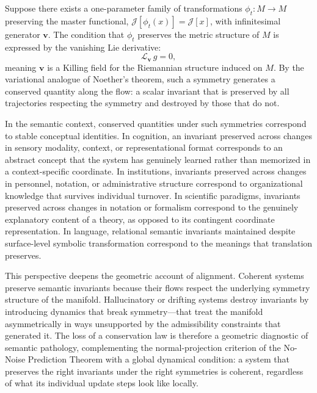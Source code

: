 \documentclass[11pt,a4paper,twocolumn]{article}
\begin{document}
Suppose there exists a one-parameter family of transformations
$\phi_t : M \to M$ preserving the master functional,
$\mathcal{J}[\phi_t(x)] = \mathcal{J}[x]$, with infinitesimal
generator $\mathbf{v}$. The condition that $\phi_t$ preserves the
metric structure of $M$ is expressed by the vanishing Lie derivative:
\[
\mathcal{L}_{\mathbf{v}}\, g = 0,
\]
meaning $\mathbf{v}$ is a Killing field for the Riemannian structure
induced on $M$. By the variational analogue of Noether's theorem,
such a symmetry generates a conserved quantity along the flow: a
scalar invariant that is preserved by all trajectories respecting the
symmetry and destroyed by those that do not.

In the semantic context, conserved quantities under such symmetries
correspond to stable conceptual identities. In cognition, an invariant
preserved across changes in sensory modality, context, or representational
format corresponds to an abstract concept that the system has genuinely
learned rather than memorized in a context-specific coordinate. In
institutions, invariants preserved across changes in personnel, notation,
or administrative structure correspond to organizational knowledge
that survives individual turnover. In scientific paradigms, invariants
preserved across changes in notation or formalism correspond to the
genuinely explanatory content of a theory, as opposed to its
contingent coordinate representation. In language, relational semantic
invariants maintained despite surface-level symbolic transformation
correspond to the meanings that translation preserves.

This perspective deepens the geometric account of alignment. Coherent
systems preserve semantic invariants because their flows respect the
underlying symmetry structure of the manifold. Hallucinatory or
drifting systems destroy invariants by introducing dynamics that break
symmetry---that treat the manifold asymmetrically in ways unsupported
by the admissibility constraints that generated it. The loss of a
conservation law is therefore a geometric diagnostic of semantic
pathology, complementing the normal-projection criterion of the
No-Noise Prediction Theorem with a global dynamical condition: a
system that preserves the right invariants under the right symmetries
is coherent, regardless of what its individual update steps look like
locally.

\end{document}

